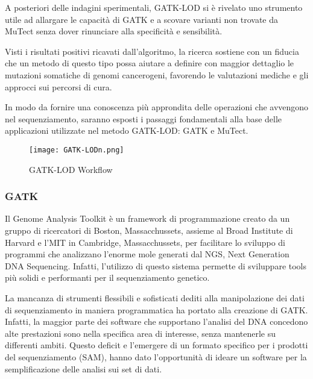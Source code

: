A posteriori delle indagini sperimentali, GATK-LOD si è rivelato uno strumento utile ad allargare le capacità di GATK e a scovare varianti non trovate da MuTect senza dover rinunciare alla specificità e sensibilità.

Visti i risultati positivi ricavati dall'algoritmo, la ricerca sostiene con un fiducia che un metodo di questo tipo possa aiutare a definire con maggior dettaglio le mutazioni somatiche di genomi cancerogeni, favorendo le valutazioni mediche e gli approcci sui percorsi di cura.

In modo da fornire una conoscenza più approndita delle operazioni che avvengono nel sequenziamento, saranno esposti %
i passaggi fondamentali alla base delle applicazioni utilizzate nel metodo GATK-LOD: GATK e MuTect.
\begin{figure}[H]
\centering
\texttt{[image: GATK-LODn.png]}
\caption{GATK-LOD Workflow}
\label{fig: GATK-LODn}
\end{figure}


\subsubsection{GATK}
Il Genome Analysis Toolkit è un framework di programmazione creato da un gruppo di ricercatori di Boston, Massacchussets, assieme al Broad Institute di Harvard e l'MIT in Cambridge, Massacchussets, per facilitare lo sviluppo di programmi che analizzano l'enorme mole generati dal NGS, Next Generation DNA Sequencing.
Infatti, l'utilizzo di questo sistema permette di sviluppare tools più solidi e performanti per il sequenziamento genetico.

La mancanza di strumenti flessibili e sofisticati dediti alla manipolazione dei dati di sequenziamento in maniera programmatica ha portato alla creazione di GATK.
Infatti, la maggior parte dei software che supportano l'analisi del DNA concedono alte prestazioni sono nella specifica area di interesse, senza mantenerle su differenti ambiti.
Questo deficit e l'emergere di un formato specifico per i prodotti del sequenziamento (SAM), hanno dato l'opportunità di ideare un software per la semplificazione delle analisi sui set di dati.

